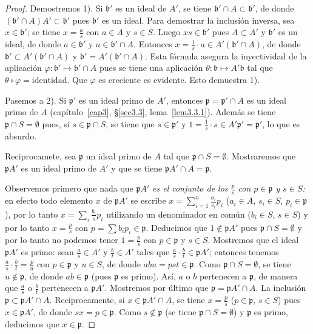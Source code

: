 \documentclass[10pt,oneside,bibtotoc,smallheadings,leqno,a5paper,DIV=12]{scrbook}
\newcommand{\idl}[1]{\mathfrak{#1}}
\numberwithin{equation}{section}
\theoremstyle{defi}
\theoremstyle{enonce}
\theoremstyle{rem}
\numberwithin{theorem}{section}
\numberwithin{proposition}{section}
\numberwithin{definition}{section}
\numberwithin{lemma}{section}
\numberwithin{corollary}{section}
\numberwithin{example}{section}
\numberwithin{footnote}{section}%
\begin{document}
\begin{proof}
Demostremos 1). Si $\idl{b}'$ es un ideal de $A'$, se tiene $\idl{b}'\cap A\subset\idl{b}'$, de donde
$(\idl{b}'\cap A)A'\subset\idl{b}'$ pues $\idl{b}'$ es un ideal. Para demostrar la inclusi\'on inversa, sea
$x\in\idl{b}'$; se tiene $x = \frac{a}{s}$ con $a\in A$ y $s\in S$. Luego $xs\in\idl{b}'$ pues
$A\subset A'$ y $\idl{b}'$ es un ideal, de donde $a\in\idl{b}'$ y $a\in\idl{b}'\cap A$. Entonces
$x=\frac{1}{s}\cdot a\in A'(\idl{b}'\cap A)$, de donde $\idl{b}'\subset A'(\idl{b}'\cap A)$ y
$\idl{b}'=A'(\idl{b}'\cap A)$. Esta f\'ormula asegura la inyectividad de la aplicaci\'on
$\varphi:\idl{b}'\mapsto\idl{b}'\cap A$ pues se tiene una aplicaci\'on $\theta:\idl{b}\mapsto A'\idl{b}$
tal que $\theta\circ\varphi = \text{identidad}$. Que $\varphi$ es creciente es evidente. Esto demuestra 1).

Pasemos a 2). Si $\idl{p}'$ es un ideal primo de $A'$, entonces $\idl{p} = \idl{p}'\cap A$ es un ideal primo de $A$
(cap\'itulo~\ref{cap3}, \S\ref{sec3.3}, lema~\ref{lem3.3.1}).
Adem\'as se tiene $\idl{p}\cap S=\emptyset$ pues, si
$s\in\idl{p}\cap S$, se tiene que $s\in\idl{p}'$ y $1=\frac{1}{s}\cdot s\in A'\idl{p}'=\idl{p}'$, lo que
es absurdo.

Reciprocamete, sea $\idl{p}$ un ideal primo de $A$ tal que $\idl{p}\cap S=\emptyset$. Mostraremos que
$\idl{p}A'$ es un ideal primo de $A'$ y que se tiene $\idl{p}A'\cap A = \idl{p}$.

Observemos primero que nada que $\idl{p}A'$ {\em es el conjunto de los $\frac{p}{s}$ con
$p\in\idl{p}$ y $s\in S$:} en efecto todo elemento $x$ de $\idl{p}A'$ se escribe
$x=\sum_{i=1}^{n}\frac{a_{i}}{s_{i}}p_{i}$
($a_{i}\in A$, $s_{i}\in S$, $p_{i}\in\idl{p}$), por lo tanto $x=\sum_{i}\frac{b_{i}}{s}p_{i}$ utilizando
un denominador en com\'un ($b_{i}\in S$, $s\in S$) y por lo tanto $x = \frac{p}{s}$ con $p=\sum b_{i}p_{i}\in\idl{p}$.
Deducimos que $1\notin\idl{p}A'$ pues $\idl{p}\cap S=\emptyset$ y por lo tanto no podemos tener
$1=\frac{p}{s}$ con $p\in\idl{p}$ y $s\in S$. Mostremos que el ideal $\idl{p}A'$ es primo:
sean $\frac{a}{s}\in A'$ y $\frac{b}{t}\in A'$ tales que $\frac{a}{s}\cdot\frac{b}{t}\in\idl{p}A'$; entonces
tenemos $\frac{a}{s}\cdot\frac{b}{t} = \frac{p}{u}$ con $p\in\idl{p}$ y $u\in S$, de donde
$abu = pst\in\idl{p}$. Como $\idl{p}\cap S=\emptyset$, se tiene $u\notin\idl{p}$, de donde $ab\in\idl{p}$
(pues $\idl{p}$ es primo). As\'i, $a$ o $b$ pertenecen a $\idl{p}$, de manera que
$\frac{a}{s}$ o $\frac{b}{t}$ pertenecen a $\idl{p}A'$. Mostremos por \'ultimo que $\idl{p}=\idl{p}A'\cap A$.
La inclusi\'on $\idl{p}\subset\idl{p}A'\cap A$. Reciprocamente, si $x\in\idl{p}A'\cap A$, se tiene
$x = \frac{p}{s}$ ($p\in\idl{p}$, $s\in S$) pues $x\in\idl{p}A'$, de donde $sx = p\in\idl{p}$. Como
$s\notin\idl{p}$ (se tiene $\idl{p}\cap S = \emptyset$) y $\idl{p}$ es primo, deducimos que $x\in\idl{p}$.


\end{proof}
\end{document}
